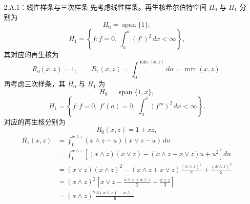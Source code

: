 \begin{bookexample}{2.A.1：线性样条与三次样条}
先考虑线性样条。再生核希尔伯特空间 $H_0$ 与 $H_1$ 分别为
\[
H_0=\operatorname{span}\{1\},
\]
\[
H_1=\left\{f:f=0,\ \int_a^b(f')^2\,dx<\infty\right\},
\]
其对应的再生核为
\[
R_0(x,z)=1,\qquad
R_1(x,z)=\int_0^{\min(x,z)}du=\min(x,z).
\]
再考虑三次样条，其 $H_0$ 与 $H_1$ 为
\[
H_0=\operatorname{span}\{1,x\},
\]
\[
H_1=\left\{f:f=0,\ f'(a)=0,\ \int_a^b(f''')^2\,dx<\infty\right\}.
\]
对应的再生核分别为
\[
R_0(x,z)=1+xz,
\]
\[
\begin{aligned}
R_1(x,z)
 &=\int_0^{x\wedge z}(x\wedge z-u)(x\vee z-u)\,du\\
 &=\int_0^{x\wedge z}
 \left[(x\wedge z)(x\vee z)-(x\wedge z+x\vee z)u+u^2\right]du\\
 &=(x\vee z)(x\wedge z)^2
   -(x\wedge z+x\vee z)\frac{(x\wedge z)^2}{2}
   +\frac{(x\wedge z)^3}{3}\\
 &=(x\wedge z)^2
   \left[x\vee z-\frac{x\wedge z+x\vee z}{2}
   +\frac{x\vee z}{3}\right]\\
 &=(x\wedge z)^2\frac{3(x\vee z)-x\wedge z}{6}.
\end{aligned}
\]
\end{bookexample}

